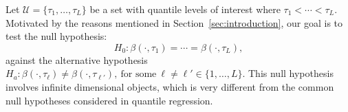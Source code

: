 \documentclass[times,sort&compress,3p]{elsarticle}
\theoremstyle{plain}%
\theoremstyle{definition}
\begin{document}
Let $\mathcal{U} =  \{\tau_1, \ldots, \tau_L\}$ be a set with quantile levels of
interest where $\tau_1 <
\cdots < \tau_L$. Motivated by the reasons mentioned in Section~\ref{sec:introduction}, our goal is to test the null hypothesis:
\begin{equation}\label{H0:original}
H_0: \beta(\cdot, \tau_1) = \cdots = \beta(\cdot,\tau_L),
\end{equation}
against the alternative hypothesis $H_a: \beta(\cdot, \tau_{\ell}) \neq  \beta(\cdot,\tau_{\ell'}),~ \text{for some} ~ \ell \neq \ell'\in \{1,\ldots,L\}$. This null hypothesis involves infinite dimensional objects, which is very different from the common null hypotheses considered in quantile regression. 

\end{document}
